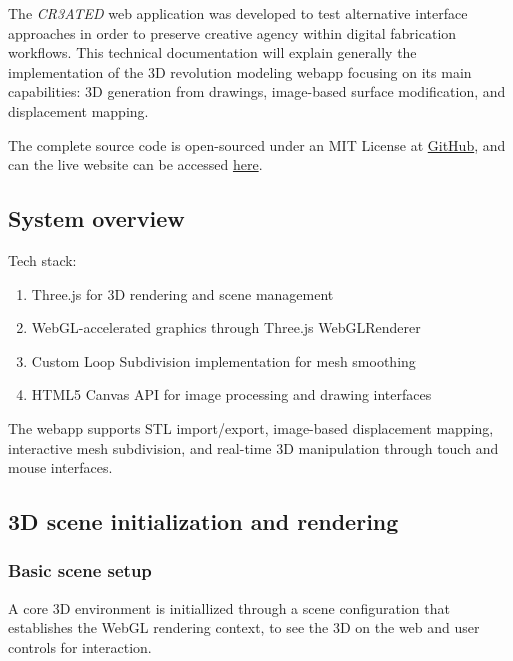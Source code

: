 The \textit{CR3ATED} web application was developed to test alternative interface approaches in order to preserve creative agency within digital fabrication workflows. This technical documentation will explain generally the implementation of the 3D revolution modeling webapp focusing on its main capabilities: 3D generation from drawings, image-based surface modification, and displacement mapping.

\vspace{0.5cm}

The complete source code is open-sourced under an MIT License at \href{https://github.com/jmuozan/CR3ATED}{GitHub}, and can the live website can be accessed \href{https://jmuozan.github.io/CR3ATED/}{here}.

\subsection{System overview}

Tech stack:
\begin{enumerate}
\item Three.js for 3D rendering and scene management
\item WebGL-accelerated graphics through Three.js WebGLRenderer
\item Custom Loop Subdivision implementation for mesh smoothing
\item HTML5 Canvas API for image processing and drawing interfaces
\end{enumerate}

\vspace{0.5cm}

The webapp supports STL import/export, image-based displacement mapping, interactive mesh subdivision, and real-time 3D manipulation through touch and mouse interfaces.

\subsection{3D scene initialization and rendering}

\subsubsection{Basic scene setup}

A core 3D environment is initiallized through a scene configuration that establishes the WebGL rendering context, to see the 3D on the web and user controls for interaction. 

